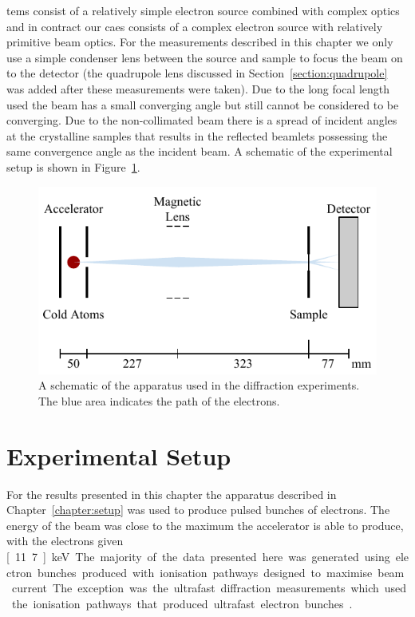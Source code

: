 \Glspl{tem} consist of a relatively simple electron source combined with complex optics and in contract our \gls{caes} consists of a complex electron source with relatively primitive beam optics.
For the measurements described in this chapter we only use a simple condenser lens between the source and sample to focus the beam on to the detector (the quadrupole lens discussed in Section~\ref{section:quadrupole} was added after these measurements were taken).
Due to the long focal length used the beam has a small converging angle but still cannot be considered to be converging.
Due to the non-collimated beam there is a spread of incident angles at the crystalline samples that results in the reflected beamlets possessing the same convergence angle as the incident beam.
A schematic of the experimental setup is shown in Figure~\ref{figure:diffraction_geometry}.

\begin{figure}
    \center
    \includegraphics{part2/Figs/DiffractionGeometry.pdf}
    \caption{A schematic of the apparatus used in the diffraction experiments. The blue area indicates the path of the electrons.}
    \label{figure:diffraction_geometry}
\end{figure}

\section{Experimental Setup}

For the results presented in this chapter the apparatus described in Chapter~\ref{chapter:setup} was used to produce pulsed bunches of electrons.
The energy of the beam was close to the maximum the accelerator is able to produce, with the electrons given \unit[11.7]{keV}.

The majority of the data presented here was generated using electron bunches produced with ionisation pathways designed to maximise beam current.
The exception was the ultrafast diffraction measurements which used the ionisation pathways that produced ultrafast electron bunches~\cite{speirs_single-shot_2015,speirs_identification_2017,speirs_electron_2017}.

